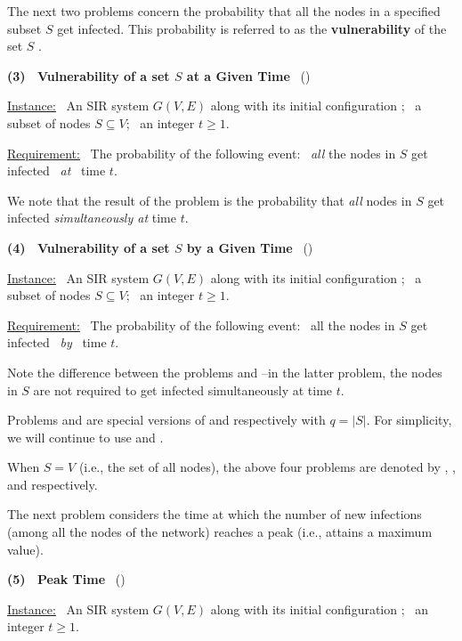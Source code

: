 \medskip
The next two problems concern the probability that all the nodes
in a specified subset $S$ get infected. 
This probability is referred to as the \textbf{vulnerability} of the set $S$
\cite{BB+2009}.

\medskip
\noindent
\textbf{(3)~ Vulnerability of a set $S$ at a Given Time}~ (\tVuls)

\medskip
\noindent
\underline{Instance:}~ An SIR system $G(V,E)$ along with its initial
configuration \cali;~ a subset of nodes $S \subseteq V$;~ an integer $t \geq 1$.

\smallskip
\noindent
\underline{Requirement:}~ The probability of the following
event:~ \emph{all} the nodes in $S$ get infected ~\emph{at}~ time $t$. 

\medskip
We note that the result of the \tVuls{} problem is the
probability that \emph{all} nodes in $S$ get infected 
\emph{simultaneously at} time $t$.

\medskip
\noindent
\textbf{(4)~ Vulnerability of a set $S$ by a Given Time}~ (\tTotVuls)

\medskip
\noindent
\underline{Instance:}~ An SIR system $G(V,E)$ along with its initial
configuration \cali;~ a subset of nodes $S \subseteq V$;~ an integer $t \geq 1$.

\smallskip
\noindent
\underline{Requirement:}~ The probability of the following
event:~ all the nodes in $S$ get infected ~\emph{by}~ time $t$. 

\medskip
Note the difference
between the problems \tVuls{} and \tTotVuls{}--in the latter problem, 
the nodes in $S$ are not required to get infected
simultaneously at time $t$.

\medskip
Problems \tVuls{} and \tTotVuls{} are special versions 
of \tNewInfs{} and \tTotInfs{} respectively with $q = |S|$.
For simplicity, we will continue to use \tVuls{} and \tTotVuls.

\medskip
When $S = V$ (i.e., the set of all nodes),
the above four problems are denoted by 
\tNewInfv, \tTotInfv, \tVulv{} and \tTotVulv{}
respectively.

\medskip
The next problem considers 
the time at which the number of new
infections (among all the nodes of the network)
reaches a peak (i.e., attains a maximum value).

\medskip
\noindent
\textbf{(5)~ Peak Time}~ (\tPeak)

\medskip
\noindent
\underline{Instance:}~ An SIR system $G(V,E)$ along with its initial
configuration \cali;~ an integer $t \geq 1$.

